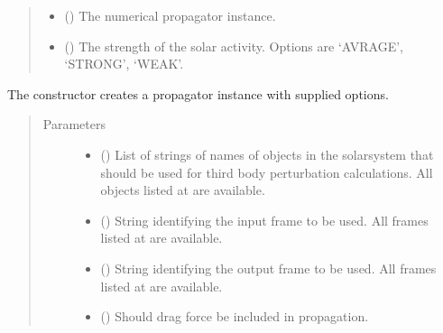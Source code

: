 \documentclass[letterpaper,10pt,english]{sphinxmanual}
\begin{document}
\begin{fulllineitems}
\begin{quote}
\begin{description}
\begin{itemize}
\item {} 
 () \textendash{} The numerical propagator instance.

\item {} 
 () \textendash{} The strength of the solar activity. Options are ‘AVRAGE’, ‘STRONG’, ‘WEAK’.

\end{itemize}

\end{description}\end{quote}

The constructor creates a propagator instance with supplied options.
\begin{quote}\begin{description}
\item[{Parameters}] \leavevmode\begin{itemize}
\item {} 
 () \textendash{} 
List of strings of names of objects in the solarsystem that should be used for third body perturbation calculations. All objects listed at  are available.


\item {} 
 () \textendash{} 
String identifying the input frame to be used. All frames listed at  are available.


\item {} 
 () \textendash{} 
String identifying the output frame to be used. All frames listed at  are available.


\item {} 
 () \textendash{} Should drag force be included in propagation.


\end{itemize}
\end{description}
\end{quote}
\end{fulllineitems}
\end{document}

